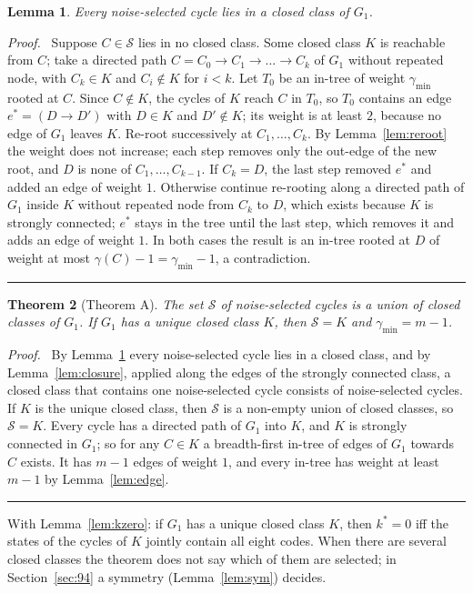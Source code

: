 \documentclass[10pt,a4paper]{article}
\newtheorem{theorem}{Theorem}[section]
\newtheorem{lemma}[theorem]{Lemma}
\newcommand{\qedmark}{\rule{1.1ex}{1.1ex}}
\newenvironment{proof}[1][Proof]{\par\smallskip\noindent\textit{#1.}\ }{\hfill\qedmark\par\smallskip}
\newcommand{\gmin}{\gamma_{\min}}
\newcommand{\Sel}{\mathcal{S}}                %
\newcommand{\Gone}{G_1}                       %
\newcommand{\kst}{k^{*}}
\begin{document}
\begin{lemma}\label{lem:inclosed}
Every noise-selected cycle lies in a closed class of $\Gone$.
\end{lemma}
\begin{proof}
Suppose $C\in\Sel$ lies in no closed class. Some closed class $K$ is reachable from $C$; take a directed path
$C=C_0\to C_1\to\dots\to C_k$ of $\Gone$ without repeated node, with $C_k\in K$ and $C_i\notin K$ for $i<k$. Let $T_0$ be an in-tree of weight
$\gmin$ rooted at $C$. Since $C\notin K$, the cycles of $K$ reach $C$ in $T_0$, so $T_0$ contains an edge
$e^*=(D\to D')$ with $D\in K$ and $D'\notin K$; its weight is at least $2$, because no edge of $\Gone$ leaves $K$.
Re-root successively at $C_1,\dots,C_k$. By Lemma~\ref{lem:reroot} the weight does not increase; each step removes
only the out-edge of the new root, and $D$ is none of $C_1,\dots,C_{k-1}$. If $C_k=D$, the last step removed $e^*$ and
added an edge of weight $1$. Otherwise continue re-rooting along a directed path of $\Gone$ inside $K$ without repeated
node from $C_k$ to $D$, which exists because $K$ is strongly connected; $e^*$ stays in the tree until the last step,
which removes it and adds an edge of weight $1$. In both cases the result is an in-tree rooted at $D$ of weight at most
$\gamma(C)-1=\gmin-1$, a contradiction.
\end{proof}

\begin{theorem}[Theorem A]\label{thm:A}
The set $\Sel$ of noise-selected cycles is a union of closed classes of $\Gone$. If $\Gone$ has a unique closed class
$K$, then $\Sel=K$ and $\gmin=m-1$.
\end{theorem}
\begin{proof}
By Lemma~\ref{lem:inclosed} every noise-selected cycle lies in a closed class, and by Lemma~\ref{lem:closure}, applied
along the edges of the strongly connected class, a closed class that contains one noise-selected cycle consists of
noise-selected cycles. If $K$ is the unique closed class, then $\Sel$ is a non-empty union of closed classes, so
$\Sel=K$. Every cycle has a directed path of $\Gone$ into $K$, and $K$ is strongly connected in $\Gone$; so for any
$C\in K$ a breadth-first in-tree of edges of $\Gone$ towards $C$ exists. It has $m-1$ edges of weight $1$, and every
in-tree has weight at least $m-1$ by Lemma~\ref{lem:edge}.
\end{proof}

With Lemma~\ref{lem:kzero}: if $\Gone$ has a unique closed class $K$, then $\kst=0$ iff the states of the cycles of
$K$ jointly contain all eight codes. When there are several closed classes the theorem does not say which of them
are selected; in Section~\ref{sec:94} a symmetry (Lemma~\ref{lem:sym}) decides.
\end{document}
